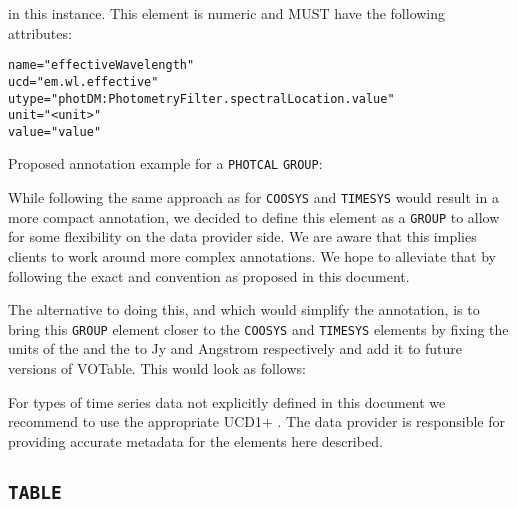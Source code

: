 \documentclass[11pt,a4paper]{ivoa} 
\let\fg=\color
\def\elem#1{{\tt{\fg{DarkRed}#1}}}
\def\attrval#1#2{{\tt{\fg{DarkRed}#1}="{\fg{DarkPurple}#2}"}}
\begin{document}
\begin{description}
  in this instance. This element is numeric and MUST have the following
  attributes:
\begin{description}
    \item[\attrval{name}{effectiveWavelength}]
    \item[\attrval{ucd}{em.wl.effective}]
    \item[\attrval{utype}{photDM:PhotometryFilter.spectralLocation.value}]
    \item[\attrval{unit}{<unit>}]
    \item[\attrval{value}{value}]
\end{description}
\end{description}

Proposed annotation example for a \texttt{PHOTCAL} \elem{GROUP}:



While following the same approach as for \elem{COOSYS} and
\elem{TIMESYS} would result in a more compact annotation, we decided
to define this element as a \elem{GROUP} to allow for some flexibility
on the data provider side. We are aware that this implies clients to
work around more complex annotations. We hope to alleviate that by
following the exact  and  convention as
proposed in this document.

The alternative to doing this, and which would simplify the
annotation, is to bring this \elem{GROUP} element closer to the
\elem{COOSYS} and \elem{TIMESYS} elements by fixing the units of the
 and the  to Jy and
Angstrom respectively and add it to future versions of VOTable. This
would look as follows:




%

For types of time series data not explicitly defined in this document
we recommend to use the appropriate UCD1+
\citep{2005ivoa.spec.0819D}. The data provider is responsible for
providing accurate metadata for the elements here described.


%
\subsection{\elem{TABLE}}
\end{document}
